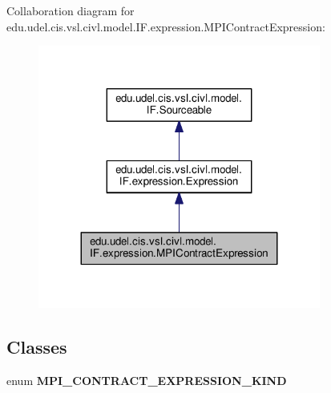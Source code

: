 Collaboration diagram for edu.\+udel.\+cis.\+vsl.\+civl.\+model.\+I\+F.\+expression.\+M\+P\+I\+Contract\+Expression\+:
\nopagebreak
\begin{figure}[H]
\begin{center}
\leavevmode
\includegraphics[width=263pt]{interfaceedu_1_1udel_1_1cis_1_1vsl_1_1civl_1_1model_1_1IF_1_1expression_1_1MPIContractExpression__coll__graph}
\end{center}
\end{figure}
\subsection*{Classes}
\begin{DoxyCompactItemize}
\item 
enum {\bfseries M\+P\+I\+\_\+\+C\+O\+N\+T\+R\+A\+C\+T\+\_\+\+E\+X\+P\+R\+E\+S\+S\+I\+O\+N\+\_\+\+K\+I\+N\+D}
\end{DoxyCompactItemize}
